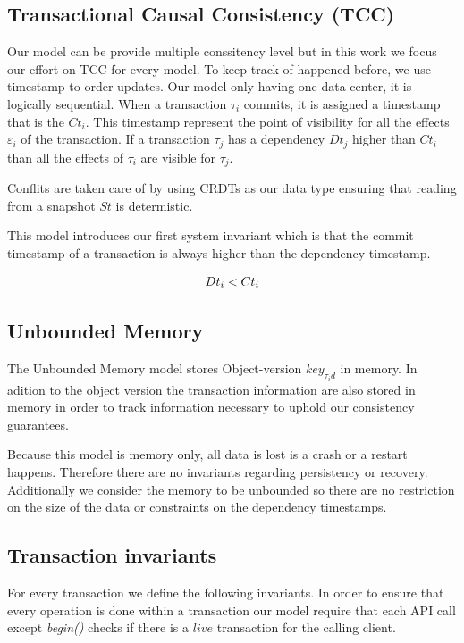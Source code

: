 \documentclass[systeme]{compas2022}
\begin{document}
\subsection{Transactional Causal Consistency (TCC)}

Our model can be provide multiple conssitency level but in this work we focus our effort on TCC for every model.
To keep track of happened-before, we use timestamp to order updates.
Our model only having one data center, it is logically sequential.
When a transaction $\tau_i$ commits, it is assigned a timestamp that is the $Ct_i$.
This timestamp represent the point of visibility for all the effects $\varepsilon_i$ of the transaction.
If a transaction $\tau_j$ has a dependency $Dt_j$ higher than $Ct_i$ than all the effects of $\tau_i$ are visible for $\tau_j$.

Conflits are taken care of by using CRDTs as our data type ensuring that reading from a snapshot $St$ is determistic.

This model introduces our first system invariant which is that the commit timestamp of a transaction is always higher than the dependency timestamp.

\[
  \begin{array}{lcl}
    \emph{$Dt_i < Ct_i$}
  \end{array} 
\]

\subsection{Unbounded Memory}

The Unbounded Memory model stores Object-version $key_{\tau_id}$ in memory.
In adition to the object version the transaction information are also stored in memory in order to track information necessary to uphold our consistency guarantees.

Because this model is memory only, all data is lost is a crash or a restart happens.
Therefore there are no invariants regarding persistency or recovery.
Additionally we consider the memory to be unbounded so there are no restriction on the size of the data or constraints on the dependency timestamps.

\subsection{Transaction invariants}

For every transaction we define the following invariants.
In order to ensure that every operation is done within a transaction our model require that each API call except \emph{begin()} checks if there is a $live$ transaction for the calling client.
\end{document}

